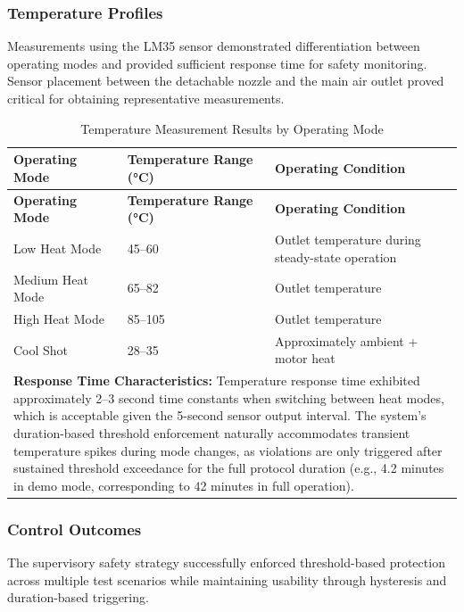 \documentclass[11pt,a4paper]{article}
\begin{document}
\subsubsection*{Temperature Profiles}

Measurements using the LM35 sensor demonstrated differentiation between operating modes and provided sufficient response time for safety monitoring. Sensor placement between the detachable nozzle and the main air outlet proved critical for obtaining representative measurements.

\begin{longtable}{|p{}|p{}|p{}|}
\caption{Temperature Measurement Results by Operating Mode}
\label{tab:temperature_profiles} \\
\hline
\textbf{Operating Mode} & \textbf{Temperature Range (°C)} & \textbf{Operating Condition} \\
\hline
\endfirsthead
\hline
\textbf{Operating Mode} & \textbf{Temperature Range (°C)} & \textbf{Operating Condition} \\
\hline
\endhead
\hline
\endfoot
\hline
\endlastfoot
Low Heat Mode & 45--60 & Outlet temperature during steady-state operation \\
\hline
Medium Heat Mode & 65--82 & Outlet temperature \\
\hline
High Heat Mode & 85--105 & Outlet temperature \\
\hline
Cool Shot & 28--35 & Approximately ambient + motor heat \\
\hline
\multicolumn{3}{|p{0.92\textwidth}|}{\textbf{Response Time Characteristics:} Temperature response time exhibited approximately 2--3 second time constants when switching between heat modes, which is acceptable given the 5-second sensor output interval. The system's duration-based threshold enforcement naturally accommodates transient temperature spikes during mode changes, as violations are only triggered after sustained threshold exceedance for the full protocol duration (e.g., 4.2 minutes in demo mode, corresponding to 42 minutes in full operation).} \\
\hline
\end{longtable}

\subsubsection*{Control Outcomes}

The supervisory safety strategy successfully enforced threshold-based protection across multiple test scenarios while maintaining usability through hysteresis and duration-based triggering.
\end{document}

